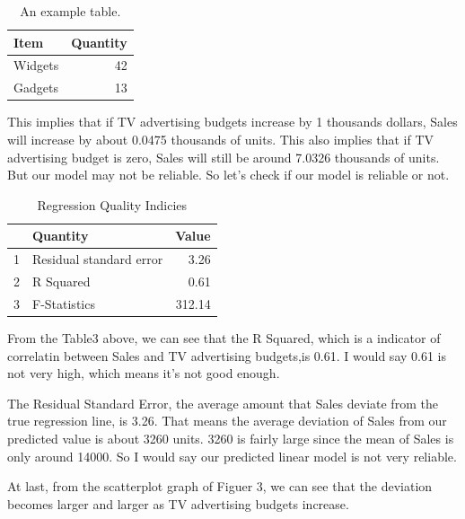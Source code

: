 \documentclass{article}
\begin{document}
\begin{table}
\centering
\begin{tabular}{l|r}

Item & Quantity \\\hline
Widgets & 42 \\
Gadgets & 13

\end{tabular}
\caption{\label{tab:widgets}An example table.}
\end{table}

\noindent
This implies that if TV advertising budgets increase by 1 thousands dollars, Sales will increase by about 0.0475 thousands of units. This also implies that if TV advertising budget is zero, Sales will still be around 7.0326 thousands of units. But our model may not be reliable. So let's check if our model is reliable or not.

\begin{table}[ht]
\centering
\begin{tabular}{rlr}
  \hline
 & Quantity & Value \\ 
  \hline
1 & Residual standard error & 3.26 \\ 
  2 & R Squared & 0.61 \\ 
  3 & F-Statistics & 312.14 \\ 
   \hline
\end{tabular}
\caption{Regression Quality Indicies} 
\end{table}\noindent
From the Table3 above, we can see that the R Squared, which is a indicator of correlatin between Sales and TV advertising budgets,is 0.61. I would say 0.61 is not very high, which means it's not good enough.\newline

\noindent
The Residual Standard Error, the average amount that Sales deviate from the true regression line, is 3.26. That means the average deviation of Sales from our predicted value is about 3260 units. 3260 is fairly large since the mean of Sales is only around 14000. So I would say our predicted linear model is not very reliable.\newline

\noindent
At last, from the scatterplot graph of Figuer 3, we can see that the deviation becomes larger and larger as TV advertising budgets increase.
\end{document}

